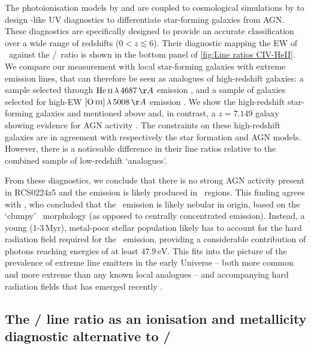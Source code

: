 The photoionisation models by \citet{2016MNRAS.462.1757G} and \citet{2016MNRAS.456.3354F} are coupled to cosmological simulations by \citet{2019MNRAS.487..333H} to design -like UV diagnostics to differentiate star-forming galaxies from AGN. These diagnostics are specifically designed to provide an accurate classification over a wide range of redshifts ($0 < z \lesssim 6$). Their diagnostic mapping the EW of \CIV\ against the \CIV/\HeII\ ratio is shown in the bottom panel of \cref{fig:Line ratios CIV-HeII}. We compare our measurement with local star-forming galaxies with extreme emission lines, that can therefore be seen as analogues of high-redshift galaxies: a sample selected through $\HeII \, \lambda \, 4687 \, \Angstrom$ emission \citep[implying a hard ionising spectrum; see][]{2017MNRAS.472.2608S}, and a sample of galaxies selected for high-EW $\OIIIf \, \lambda \, 5008 \, \Angstrom$ emission \citep[among other criteria;][]{2019ApJ...874...93B}. We show the high-redshift star-forming galaxies and mentioned above and, in contrast, a $z = 7.149$ galaxy showing evidence for AGN activity \citep{2017ApJ...851...40L}. The constraints on these high-redshift galaxies are in agreement with respectively the star formation and AGN models. However, there is a noticeable difference in their line ratios relative to the combined sample of low-redshift `analogues'.

From these diagnostics, we conclude that there is no strong AGN activity present in RCS0224z5 and the emission is likely produced in \HII\ regions. This finding agrees with \citet{2017MNRAS.467.3306S}, who concluded that the \CIV\ emission is likely nebular in origin, based on the `clumpy' \CIV\ morphology (as opposed to centrally concentrated emission). Instead, a young ($1$-$3 \, \mathrm{Myr}$), metal-poor stellar population likely has to account for the hard radiation field required for the \CIV\ emission, providing a considerable contribution of photons reaching energies of at least $47.9 \, \mathrm{eV}$. This fits into the picture of the prevalence of extreme line emitters in the early Universe -- both more common and more extreme than any known local analogues -- and accompanying hard radiation fields that has emerged recently \citep[e.g.][]{2014ApJ...784...58S, 2015ApJ...801..122S, 2015MNRAS.454.1393S, 2017ApJ...836L..14M, 2019ApJ...879...70H}.

\subsection{The \texorpdfstring{\NeIII/\OII}{[NeIII]/[OII]} line ratio as an ionisation and metallicity diagnostic alternative to \texorpdfstring{\OIIIf/\OII}{[OIII]/[OII]}}
\label{ssec:Discussion: NeIII/OII}

